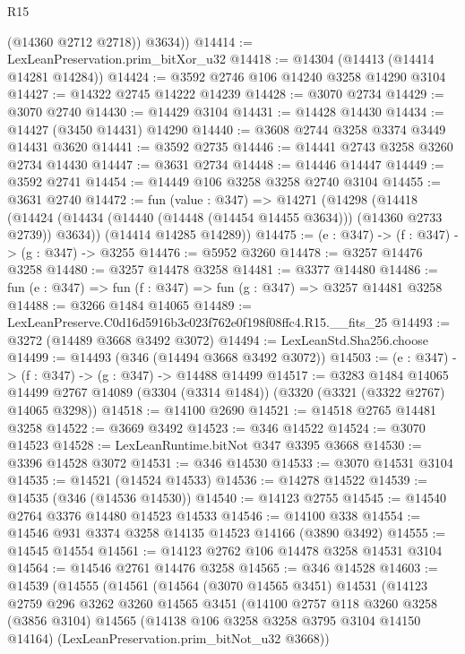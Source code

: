 \begin{lexlean}{R15}
\begin{coremodule}
          (@14360 @2712 @2718))
        @3634))
@14414 := LexLeanPreservation.prim_bitXor_u32
@14418 := @14304 (@14413 (@14414 @14281 @14284))
@14424 := @3592 @2746 @106 @14240 @3258 @14290 @3104
@14427 := @14322 @2745 @14222 @14239
@14428 := @3070 @2734
@14429 := @3070 @2740
@14430 := @14429 @3104
@14431 := @14428 @14430
@14434 := @14427 (@3450 @14431) @14290
@14440 := @3608 @2744 @3258 @3374 @3449 @14431 @3620
@14441 := @3592 @2735
@14446 := @14441 @2743 @3258 @3260 @2734 @14430
@14447 := @3631 @2734
@14448 := @14446 @14447
@14449 := @3592 @2741
@14454 := @14449 @106 @3258 @3258 @2740 @3104
@14455 := @3631 @2740
@14472 := fun (value : @347) =>
  @14271
    (@14298
      (@14418 (@14424 (@14434 (@14440 (@14448 (@14454 @14455 @3634))) (@14360 @2733 @2739)) @3634))
      (@14414 @14285 @14289))
@14475 := (e : @347) -> (f : @347) -> (g : @347) -> @3255
@14476 := @5952 @3260
@14478 := @3257 @14476 @3258
@14480 := @3257 @14478 @3258
@14481 := @3377 @14480
@14486 := fun (e : @347) => fun (f : @347) => fun (g : @347) => @3257 @14481 @3258
@14488 := @3266 @1484 @14065
@14489 := LexLeanPreserve.C0d16d5916b3c023f762e0f198f08ffc4.R15.__fits_25
@14493 := @3272 (@14489 @3668 @3492 @3072)
@14494 := LexLeanStd.Sha256.choose
@14499 := @14493 (@346 (@14494 @3668 @3492 @3072))
@14503 := (e : @347) -> (f : @347) -> (g : @347) -> @14488 @14499
@14517 := @3283
    @1484
    @14065
    @14499
    @2767
    @14089
    (@3304 (@3314 @1484))
    (@3320 (@3321 (@3322 @2767) @14065 @3298))
@14518 := @14100 @2690
@14521 := @14518 @2765 @14481 @3258
@14522 := @3669 @3492
@14523 := @346 @14522
@14524 := @3070 @14523
@14528 := LexLeanRuntime.bitNot @347 @3395 @3668
@14530 := @3396 @14528 @3072
@14531 := @346 @14530
@14533 := @3070 @14531 @3104
@14535 := @14521 (@14524 @14533)
@14536 := @14278 @14522
@14539 := @14535 (@346 (@14536 @14530))
@14540 := @14123 @2755
@14545 := @14540 @2764 @3376 @14480 @14523 @14533
@14546 := @14100 @338
@14554 := @14546 @931 @3374 @3258 @14135 @14523 @14166 (@3890 @3492)
@14555 := @14545 @14554
@14561 := @14123 @2762 @106 @14478 @3258 @14531 @3104
@14564 := @14546 @2761 @14476 @3258
@14565 := @346 @14528
@14603 := @14539
    (@14555
      (@14561
        (@14564
          (@3070 @14565 @3451)
          @14531
          (@14123
            @2759
            @296
            @3262
            @3260
            @14565
            @3451
            (@14100
              @2757
              @118
              @3260
              @3258
              (@3856 @3104)
              @14565
              (@14138 @106 @3258 @3258 @3795 @3104 @14150 @14164)
              (LexLeanPreservation.prim_bitNot_u32 @3668))

\end{coremodule}
\end{lexlean}
